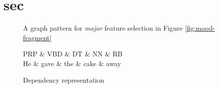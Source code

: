     
\section{sec}

    \begin{figure}[!ht]
        \centering
        \caption{A graph pattern for \textit{major} feature selection in Figure \ref{fig:mood-fragment}}
        \label{fig:mood-fragment-major}
    \end{figure}
    
    
    \begin{figure}[!ht]
        \centering
        \begin{dependency}
            \begin{deptext}[]
                PRP \& VBD \& DT \& NN \& RB\\ 
                He \& gave \& the \& cake \& away\\ 
            \end{deptext}
        \end{dependency}
        \caption{Dependency representation } %
        \label{fig:dependency-dg-ex}
    \end{figure}